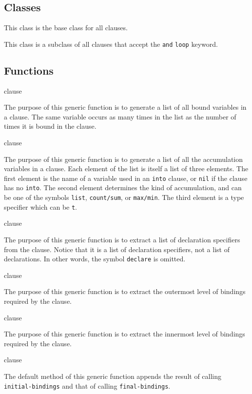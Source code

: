 \subsection{Classes}


This class is the base class for all clauses.


This class is a subclass of all clauses that accept the \texttt{and}
\texttt{loop} keyword.

\subsection{Functions}

 {clause}

The purpose of this generic function is to generate a list of all
bound variables in a clause.  The same variable occurs as many times
in the list as the number of times it is bound in the clause.

 {clause}

The purpose of this generic function is to generate a list of all the
accumulation variables in a clause.  Each element of the list is
itself a list of three elements.  The first element is the name of a
variable used in an \texttt{into} clause, or \texttt{nil} if the
clause has no \texttt{into}.  The second element determines the kind
of accumulation, and can be one of the symbols \texttt{list},
\texttt{count/sum}, or \texttt{max/min}.  The third element is a type
specifier which can be \texttt{t}.

 {clause}

The purpose of this generic function is to extract a list of
declaration specifiers from the clause.  Notice that it is a list of
declaration specifiers, not a list of declarations.  In other words,
the symbol \texttt{declare} is omitted.

 {clause}

The purpose of this generic function is to extract the outermost level
of bindings required by the clause.

 {clause}

The purpose of this generic function is to extract the innermost level
of bindings required by the clause.

 {clause}

The default method of this generic function appends the result of
calling \texttt{initial-bindings} and that of calling
\texttt{final-bindings}.
